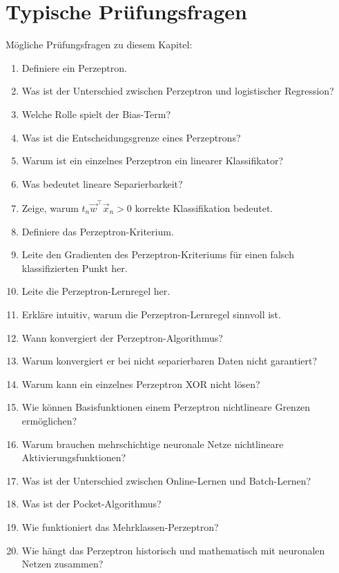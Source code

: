 \section{Typische Prüfungsfragen}

\begin{examtipbox}
Mögliche Prüfungsfragen zu diesem Kapitel:

\begin{enumerate}
    \item Definiere ein Perzeptron.
    \item Was ist der Unterschied zwischen Perzeptron und logistischer Regression?
    \item Welche Rolle spielt der Bias-Term?
    \item Was ist die Entscheidungsgrenze eines Perzeptrons?
    \item Warum ist ein einzelnes Perzeptron ein linearer Klassifikator?
    \item Was bedeutet lineare Separierbarkeit?
    \item Zeige, warum \(t_n\vec{w}^{\top}\vec{x}_n>0\) korrekte Klassifikation bedeutet.
    \item Definiere das Perzeptron-Kriterium.
    \item Leite den Gradienten des Perzeptron-Kriteriums für einen falsch klassifizierten Punkt her.
    \item Leite die Perzeptron-Lernregel her.
    \item Erkläre intuitiv, warum die Perzeptron-Lernregel sinnvoll ist.
    \item Wann konvergiert der Perzeptron-Algorithmus?
    \item Warum konvergiert er bei nicht separierbaren Daten nicht garantiert?
    \item Warum kann ein einzelnes Perzeptron XOR nicht lösen?
    \item Wie können Basisfunktionen einem Perzeptron nichtlineare Grenzen ermöglichen?
    \item Warum brauchen mehrschichtige neuronale Netze nichtlineare Aktivierungsfunktionen?
    \item Was ist der Unterschied zwischen Online-Lernen und Batch-Lernen?
    \item Was ist der Pocket-Algorithmus?
    \item Wie funktioniert das Mehrklassen-Perzeptron?
    \item Wie hängt das Perzeptron historisch und mathematisch mit neuronalen Netzen zusammen?
\end{enumerate}
\end{examtipbox}